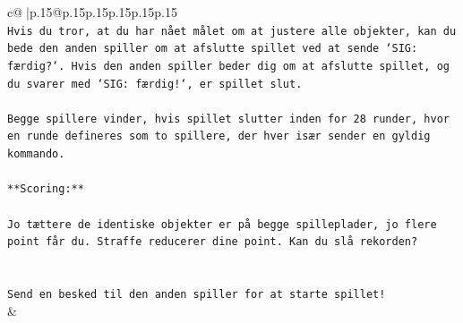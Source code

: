 \documentclass{article}
\begin{document}
{\begin{supertabular}{c@{$\;$}|p{.15\linewidth}@{}p{.15\linewidth}p{.15\linewidth}p{.15\linewidth}p{.15\linewidth}p{.15\linewidth}}
{{{\\ 
\texttt{Hvis du tror, at du har nået målet om at justere alle objekter, kan du bede den anden spiller om at afslutte spillet ved at sende `SIG: færdig?`. Hvis den anden spiller beder dig om at afslutte spillet, og du svarer med `SIG: færdig!`, er spillet slut.} \\
\\ 
\texttt{Begge spillere vinder, hvis spillet slutter inden for 28 runder, hvor en runde defineres som to spillere, der hver især sender en gyldig kommando.} \\
\\ 
\texttt{**Scoring:**} \\
\\ 
\texttt{Jo tættere de identiske objekter er på begge spilleplader, jo flere point får du. Straffe reducerer dine point. Kan du slå rekorden?} \\
\\ 
\\ 
\texttt{Send en besked til den anden spiller for at starte spillet!} \\
            }
        }
    }
    & \\ \\


\end{supertabular}}
\end{document}

